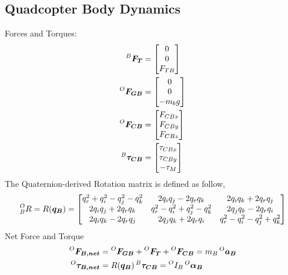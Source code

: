 \subsection{Quadcopter Body Dynamics}
Forces and Torques:
\begin{align*}
  \prescript{B}{}{\bm{F_{T}}} &=
  \begin{bmatrix}
    0 \\ 0 \\ F_{TB}
  \end{bmatrix} \\
  \prescript{O}{}{\bm{F_{GB}}} &=
  \begin{bmatrix}
    0 \\ 0 \\ -m_b g
  \end{bmatrix} \\
  \prescript{O}{}{\bm{F_{CB}}} &=
  \begin{bmatrix}
    F_{CBx} \\ F_{CBy} \\ F_{CBz} 
  \end{bmatrix} \\
  \prescript{B}{}{\bm{\tau_{CB}}} &=
  \begin{bmatrix}
    \tau_{CBx} \\ \tau_{CBy} \\ -\tau_{M} 
  \end{bmatrix}
\end{align*}
The Quaternion-derived Rotation matrix is defined as follow,
\begin{align*}
  \prescript{O}{B}{R} = R(\bm{q_B}) =
  \begin{bmatrix}
    q_r^2 + q_i^2 - q_j^2 - q_k^2 & 2q_iq_j - 2q_rq_k & 2q_iq_k + 2q_rq_j \\
    2q_iq_j + 2q_rq_k & q_r^2 - q_i^2 + q_j^2 - q_k^2 & 2q_jq_k - 2q_rq_i \\
    2q_iq_k - 2q_rq_j & 2q_jq_k + 2q_rq_i & q_r^2 - q_i^2 - q_j^2 +q_k^2
  \end{bmatrix}
\end{align*}
Net Force and Torque
\begin{align}
  \prescript{O}{}{\bm{F_{B, net}}} &= \prescript{O}{}{\bm{F_{GB}}} + \prescript{O}{}{\bm{F_{T}}} + \prescript{O}{}{\bm{F_{CB}}} = m_B \prescript{O}{}{\bm{a_B}} \\
  \prescript{O}{}{\bm{\tau_{B, net}}} &= R(\bm{q_B})\prescript{B}{}{\bm{\tau_{CB}}} = \prescript{O}{}{I_B} \prescript{O}{}{\bm{\alpha_B}}
\end{align}

